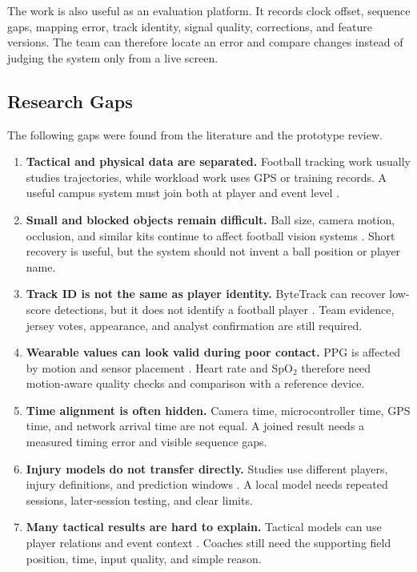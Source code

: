 The work is also useful as an evaluation platform. It records clock offset,
sequence gaps, mapping error, track identity, signal quality, corrections, and
feature versions. The team can therefore locate an error and compare changes
instead of judging the system only from a live screen.

\subsection{Research Gaps}
The following gaps were found from the literature and the prototype review.

\begin{enumerate}
  \item \textbf{Tactical and physical data are separated.} Football tracking
  work usually studies trajectories, while workload work uses GPS or training
  records. A useful campus system must join both at player and event level
  \cite{rossi2018injury,honda2022pass}.

  \item \textbf{Small and blocked objects remain difficult.} Ball size, camera
  motion, occlusion, and similar kits continue to affect football vision
  systems \cite{zheng2025sportsvision}. Short recovery is useful, but the
  system should not invent a ball position or player name.

  \item \textbf{Track ID is not the same as player identity.} ByteTrack can
  recover low-score detections, but it does not identify a football player
  \cite{zhang2022bytetrack}. Team evidence, jersey votes, appearance, and
  analyst confirmation are still required.

  \item \textbf{Wearable values can look valid during poor contact.} PPG is
  affected by motion and sensor placement \cite{charlton2022ppg,
  zhang2021ppg}. Heart rate and SpO$_2$ therefore need motion-aware quality
  checks and comparison with a reference device.

  \item \textbf{Time alignment is often hidden.} Camera time, microcontroller
  time, GPS time, and network arrival time are not equal. A joined result needs
  a measured timing error and visible sequence gaps.

  \item \textbf{Injury models do not transfer directly.} Studies use different
  players, injury definitions, and prediction windows
  \cite{pilka2023workload,leckey2025injury}. A local model needs repeated
  sessions, later-session testing, and clear limits.

  \item \textbf{Many tactical results are hard to explain.} Tactical models
  can use player relations and event context \cite{tacticai2024,
  teixeira2025tactical}. Coaches still need the supporting field position,
  time, input quality, and simple reason.
\end{enumerate}


